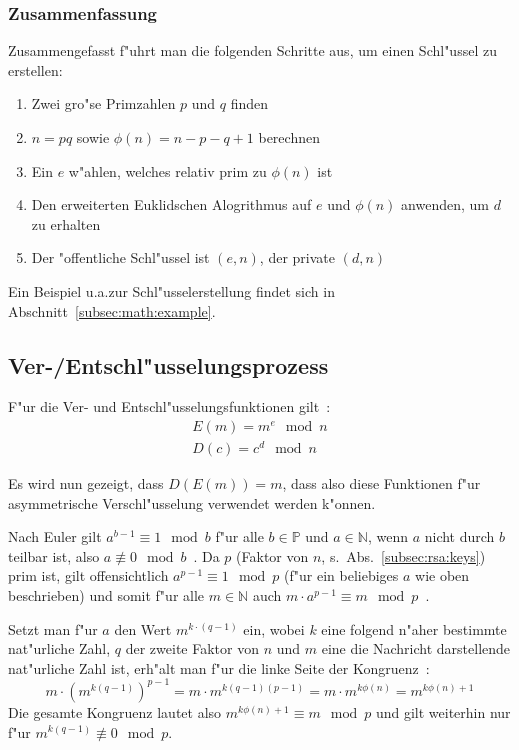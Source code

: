 \documentclass[12pt]{article}
\begin{document}
\subsubsection{Zusammenfassung}

Zusammengefasst f"uhrt man die folgenden Schritte aus, um einen Schl"ussel zu erstellen:

\begin{enumerate}
    \item Zwei gro"se Primzahlen $p$ und $q$ finden
    \item $n = pq$ sowie $\phi(n) = n - p - q + 1$ berechnen
    \item Ein $e$ w"ahlen, welches relativ prim zu $\phi(n)$ ist
    \item Den erweiterten Euklidschen Alogrithmus auf $e$ und $\phi(n)$ anwenden, um $d$ zu erhalten
    \item Der "offentliche Schl"ussel ist $(e, n)$, der private $(d, n)$
\end{enumerate}

\noindent
Ein Beispiel u.a.\@ zur Schl"usselerstellung findet sich in Abschnitt~\ref{subsec:math:example}.

\subsection{Ver-/Entschl"usselungsprozess}
F"ur die Ver- und Entschl"usselungsfunktionen gilt~\cite{rsa}:
\[
\begin{aligned}
E(m) = m^e \mod n \\
D(c) = c^d \mod n
\end{aligned}
\]

\noindent
Es wird nun gezeigt, dass $D(E(m)) = m$, dass also diese Funktionen f"ur asymmetrische Verschl"usselung
verwendet werden k"onnen.

Nach Euler gilt $a^{b-1} \equiv 1 \mod b$ f"ur alle $b \in \mathbb{P}$ und $a \in \mathbb{N}$,
wenn $a$ nicht durch $b$ teilbar ist, also $a \not\equiv 0 \mod b$~\cite{euler41}.
Da $p$ (Faktor von $n$, s.~Abs.~\ref{subsec:rsa:keys}) prim ist,
gilt offensichtlich $a^{p-1} \equiv 1 \mod p$
(f"ur ein beliebiges $a$ wie oben beschrieben) und somit f"ur alle $m \in \mathbb{N}$ auch
$m \cdot a^{p-1} \equiv m \mod p$~\cite{rsa}.

Setzt man f"ur $a$ den Wert $m^{k \cdot (q-1)}$ ein,
wobei $k$ eine folgend n"aher bestimmte nat"urliche Zahl, $q$ der zweite Faktor von $n$
und $m$ eine die Nachricht darstellende nat"urliche Zahl ist,
erh"alt man f"ur die linke Seite der Kongruenz~\cite{rsa}:
\[
    m \cdot \left(m^{k(q-1)}\right)^{p-1} = m \cdot m^{k(q-1)(p-1)} = m \cdot m^{k\phi(n)} = m^{k\phi(n) + 1}
\]
Die gesamte Kongruenz lautet also $m^{k\phi(n)+1} \equiv m \mod p$ und
gilt weiterhin nur f"ur $m^{k(q-1)} \not\equiv 0 \mod p$.
\end{document}
